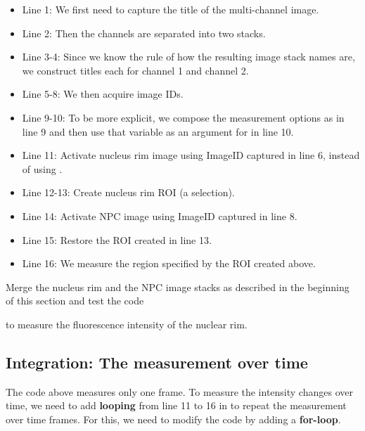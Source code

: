 \begin{itemize}
    \item Line 1: We first need to capture the title of the multi-channel image. 
    \item Line 2: Then the channels are separated into two stacks.
    \item Line 3-4: Since we know the rule of how the resulting image stack names are, we construct titles each for channel 1 and channel 2. 
    \item Line 5-8: We then acquire image IDs.
    \item Line 9-10: To be more explicit, we compose the measurement options as  in line 9 and then use that variable  as an argument for  in line 10.
    \item Line 11: Activate nucleus rim image using ImageID captured in line 6, instead of using .
    \item Line 12-13: Create nucleus rim ROI (a selection).
    \item Line 14: Activate NPC image using ImageID captured in line 8.
    \item Line 15: Restore the ROI created in line 13.
    \item Line 16: We measure the region specified by the ROI created above.
\end{itemize}

\begin{indentexercise}{3}
Merge the nucleus rim and the NPC image stacks as described in the beginning of this section and test the code


to measure the fluorescence intensity of the nuclear rim. 
\end{indentexercise}

\subsection{Integration: The measurement over time}

The code above measures only one frame. To measure the intensity changes over time, we need to add \textbf{looping} from line 11 to 16 in  to repeat the measurement over time frames. For this, we need to modify the code by adding a \textbf{for-loop}.



